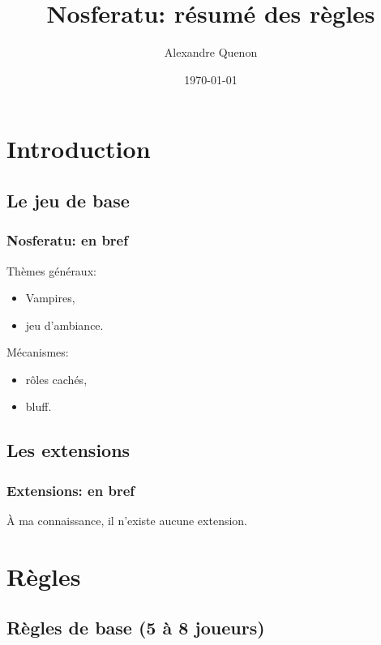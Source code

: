 \documentclass[11pt]{beamer}
\title{Nosferatu: résumé des règles}
\author[A. Quenon]{Alexandre Quenon}
\date{\today}
\begin{document}
\frame{\titlepage}


\begin{frame}
	\tableofcontents
\end{frame}

\AtBeginSection{%
	\begin{frame}
		\tableofcontents[currentsection]
	\end{frame}
}


\section{Introduction}

	\subsection{Le jeu de base}

\begin{frame}
	\frametitle{Nosferatu: en bref}
	
	Thèmes généraux:
	\begin{itemize}
		\item Vampires,
		\item jeu d'ambiance.
	\end{itemize}

	\vspace*{1ex}
	
	Mécanismes:
	\begin{itemize}
		\item rôles cachés,
		\item bluff.
	\end{itemize}
\end{frame}


	\subsection{Les extensions}
	
\begin{frame}
	\frametitle{Extensions: en bref}

	À ma connaissance, il n'existe aucune extension.
\end{frame}


\section{Règles}

	\subsection{Règles de base (5 à 8 joueurs)}
\end{document}
